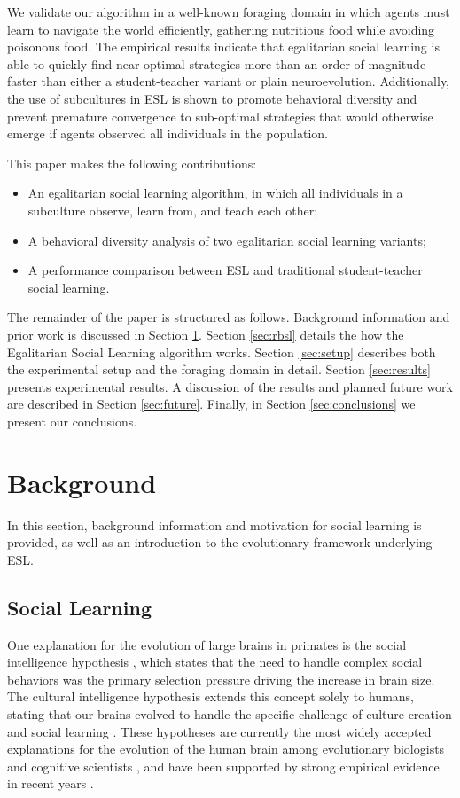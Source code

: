 \documentclass{sig-alternate}
\begin{document}
We validate our algorithm in a well-known foraging domain in which agents must learn to navigate the world efficiently, gathering nutritious food while avoiding poisonous food. The empirical results indicate that egalitarian social learning is able to quickly find near-optimal strategies more than an order of magnitude faster than either a student-teacher variant or plain neuroevolution. Additionally, the use of subcultures in ESL is shown to promote behavioral diversity and prevent premature convergence to sub-optimal strategies that would otherwise emerge if agents observed all individuals in the population.

This paper makes the following contributions:
 
\begin{itemize}
\item An egalitarian social learning algorithm, in which all individuals in a subculture observe, learn from, and teach each other;
\item A behavioral diversity analysis of two egalitarian social learning variants;
\item A performance comparison between ESL and traditional student-teacher social learning.
\end{itemize}
 
The remainder of the paper is structured as follows.
Background information and prior work is discussed in Section \ref{sec:background}.
Section \ref{sec:rbsl} details the how the Egalitarian Social Learning algorithm works. Section \ref{sec:setup} describes both the experimental setup and the foraging domain in detail.
Section \ref{sec:results} presents experimental results.
A discussion of the results and planned future work are described in Section \ref{sec:future}.
Finally, in Section \ref{sec:conclusions} we present our conclusions.

\section{Background}
\label{sec:background}
In this section, background information and motivation for social learning is provided, as well as an introduction to the evolutionary framework underlying ESL.

\subsection*{Social Learning}

One explanation for the evolution of large brains in primates is the social intelligence hypothesis \cite{byrne1989machiavellian, humphrey1976social}, which states that the need to handle complex social behaviors was the primary selection pressure driving the increase in brain size. The cultural intelligence hypothesis extends this concept solely to humans, stating that our brains evolved to handle the specific challenge of culture creation and social learning \cite{tomasello1999cultural}. These hypotheses are currently the most widely accepted explanations for the evolution of the human brain among evolutionary biologists and cognitive scientists \cite{holekamp2007questioning}, and have been supported by strong empirical evidence in recent years \cite{herrmann2007humans}.  
\end{document}
